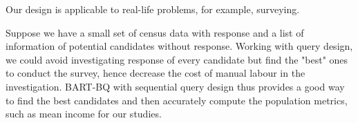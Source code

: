 


Our design is applicable to real-life problems, for example, surveying. 

Suppose we have a small set of census data with response and a list of information of potential candidates without response. Working with query design, we could avoid investigating response of every candidate but find the "best" ones to conduct the survey, hence decrease the cost of manual labour in the investigation. BART-BQ with sequential query design thus provides a good way to find the best candidates and then accurately compute the population metrics, such as mean income for our studies.

